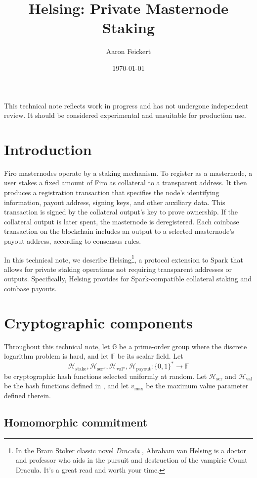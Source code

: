 \documentclass{article}
\title{Helsing: Private Masternode Staking}
\author{Aaron Feickert}
\date{\today}
\newcommand{\G}{\mathbb{G}}
\newcommand{\F}{\mathbb{F}}
\newcommand{\hash}{\mathcal{H}}
\theoremstyle{remark}
\begin{document}
\maketitle

This technical note reflects work in progress and has not undergone independent review.
It should be considered experimental and unsuitable for production use.

\section{Introduction}

Firo masternodes operate by a staking mechanism.
To register as a masternode, a user stakes a fixed amount of Firo as collateral to a transparent address.
It then produces a registration transaction that specifies the node's identifying information, payout address, signing keys, and other auxiliary data.
This transaction is signed by the collateral output's key to prove ownership.
If the collateral output is later spent, the masternode is deregistered.
Each coinbase transaction on the blockchain includes an output to a selected masternode's payout address, according to consensus rules.

In this technical note, we describe Helsing\footnote{In the Bram Stoker classic novel \textit{Dracula} \cite{dracula}, Abraham van Helsing is a doctor and professor who aids in the pursuit and destruction of the vampiric Count Dracula. It's a great read and worth your time.}, a protocol extension to Spark \cite{spark} that allows for private staking operations not requiring transparent addresses or outputs.
Specifically, Helsing provides for Spark-compatible collateral staking and coinbase payouts.


\section{Cryptographic components}

Throughout this technical note, let $\G$ be a prime-order group where the discrete logarithm problem is hard, and let $\F$ be its scalar field.
Let $$\hash_{\text{stake}},\hash_{\text{ser}''}, \hash_{\text{val}''}, \hash_{\text{payout}}: \{0,1\}^* \to \F$$ be cryptographic hash functions selected uniformly at random.
Let $\hash_{\text{ser}}$ and $\hash_{\text{val}}$ be the hash functions defined in \cite{spark}, and let $v_{\text{max}}$ be the maximum value parameter defined therein.

\subsection{Homomorphic commitment}
\end{document}
